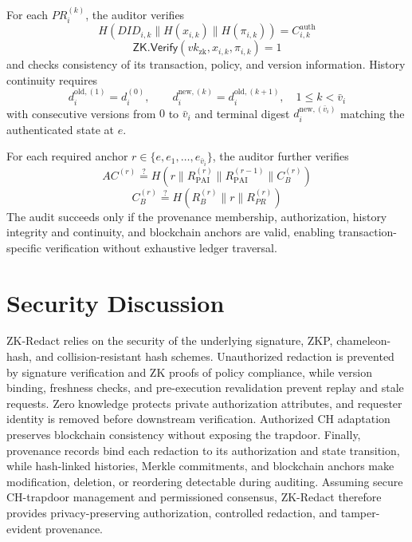 \documentclass[lettersize,journal]{IEEEtran}
\begin{document}
For each $PR_i^{(k)}$, the auditor verifies
\begin{equation}
H(DID_{i,k}\parallel H(x_{i,k})\parallel H(\pi_{i,k}))
=C_{i,k}^{\mathrm{auth}}
\end{equation}
\begin{equation}
\mathsf{ZK.Verify}(vk_{\mathrm{zk}},x_{i,k},\pi_{i,k})=1
\end{equation}
and checks consistency of its transaction, policy, and version information.
History continuity requires
\begin{equation}
d_i^{\mathrm{old},(1)}=d_i^{(0)},\qquad
d_i^{\mathrm{new},(k)}=d_i^{\mathrm{old},(k+1)},
\quad 1\le k<\bar v_i
\label{eq:audit-continuity}
\end{equation}
with consecutive versions from $0$ to $\bar v_i$ and terminal digest
$d_i^{\mathrm{new},(\bar v_i)}$ matching the authenticated state at $e$.

For each required anchor $r\in\{e,e_1,\ldots,e_{\bar v_i}\}$, the auditor
further verifies
\begin{equation}
AC^{(r)}
\stackrel{?}{=}
H(r\parallel R_{\mathrm{PAI}}^{(r)}
\parallel R_{\mathrm{PAI}}^{(r-1)}\parallel C_B^{(r)})
\end{equation}
\begin{equation}
C_B^{(r)}
\stackrel{?}{=}
H(R_B^{(r)}\parallel r\parallel R_{PR}^{(r)})
\end{equation}
The audit succeeds only if the provenance membership, authorization,
history integrity and continuity, and blockchain anchors are valid,
enabling transaction-specific verification without exhaustive ledger
traversal.


\section*{Security Discussion}

ZK-Redact relies on the security of the underlying signature, ZKP,
chameleon-hash, and collision-resistant hash schemes. Unauthorized
redaction is prevented by signature verification and ZK proofs of policy
compliance, while version binding, freshness checks, and pre-execution
revalidation prevent replay and stale requests. Zero knowledge protects
private authorization attributes, and requester identity is removed
before downstream verification. Authorized CH adaptation preserves
blockchain consistency without exposing the trapdoor. Finally, provenance
records bind each redaction to its authorization and state transition,
while hash-linked histories, Merkle commitments, and blockchain anchors
make modification, deletion, or reordering detectable during auditing.
Assuming secure CH-trapdoor management and permissioned consensus,
ZK-Redact therefore provides privacy-preserving authorization, controlled
redaction, and tamper-evident provenance.
\end{document}
